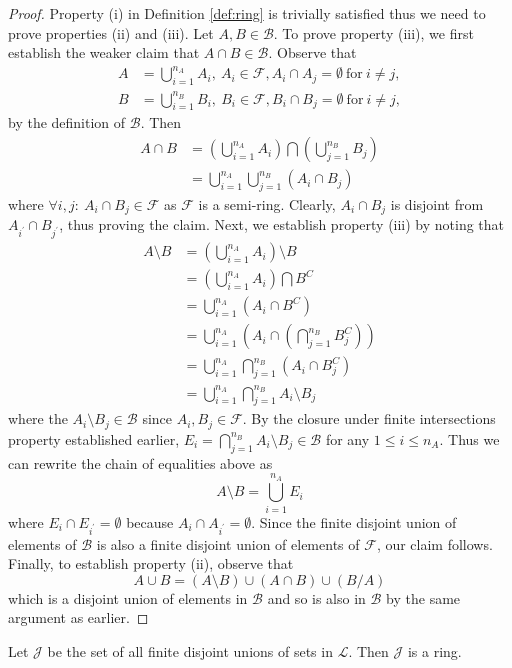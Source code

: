 \begin{proof}
Property (i) in Definition \ref{def:ring} is trivially satisfied
thus we need to prove properties (ii) and (iii). Let $A,B\in\mathcal{B}$.
To prove property (iii), we first establish the weaker claim that
$A\cap B\in\mathcal{B}$. Observe that
\begin{align*}
A & =\bigcup_{i=1}^{n_{A}}A_{i},\ A_{i}\in\mathcal{F},A_{i}\cap A_{j}=\emptyset\mathrm{\ for\ }i\neq j,\\
B & =\bigcup_{i=1}^{n_{B}}B_{i},\ B_{i}\in\mathcal{F},B_{i}\cap B_{j}=\emptyset\mathrm{\ for\ }i\neq j,
\end{align*}
by the definition of $\mathcal{B}.$ Then
\begin{align*}
A\cap B & =\left(\bigcup_{i=1}^{n_{A}}A_{i}\right)\bigcap\left(\bigcup_{j=1}^{n_{B}}B_{j}\right)\\
 & =\bigcup_{i=1}^{n_{A}}\bigcup_{j=1}^{n_{B}}\left(A_{i}\cap B_{j}\right)
\end{align*}
where $\forall i,j:\ A_{i}\cap B_{j}\in\mathcal{F}$ as $\mathcal{F}$
is a semi-ring. Clearly, $A_{i}\cap B_{j}$ is disjoint from $A_{i^{\prime}}\cap B_{j^{\prime}}$,
thus proving the claim. Next, we establish property (iii) by noting
that
\begin{align*}
A\setminus B & =\left(\bigcup_{i=1}^{n_{A}}A_{i}\right)\setminus B\\
 & =\left(\bigcup_{i=1}^{n_{A}}A_{i}\right)\bigcap B^{C}\\
 & =\bigcup_{i=1}^{n_{A}}\left(A_{i}\cap B^{C}\right)\\
 & =\bigcup_{i=1}^{n_{A}}\left(A_{i}\cap\left(\bigcap_{j=1}^{n_{B}}B_{j}^{C}\right)\right)\\
 & =\bigcup_{i=1}^{n_{A}}\bigcap_{j=1}^{n_{B}}\left(A_{i}\cap B_{j}^{C}\right)\\
 & =\bigcup_{i=1}^{n_{A}}\bigcap_{j=1}^{n_{B}}A_{i}\setminus B_{j}
\end{align*}
where the $A_{i}\setminus B_{j}\in\mathcal{B}$ since $A_{i},B_{j}\in\mathcal{F}$.
By the closure under finite intersections property established earlier,
$E_{i}=\bigcap_{j=1}^{n_{B}}A_{i}\setminus B_{j}\in\mathcal{B}$ for
any $1\leq i\leq n_{A}$. Thus we can rewrite the chain of equalities
above as
\[
A\setminus B=\bigcup_{i=1}^{n_{A}}E_{i}
\]
where $E_{i}\cap E_{i^{\prime}}=\emptyset$ because $A_{i}\cap A_{i^{\prime}}=\emptyset.$
Since the finite disjoint union of elements of $\mathcal{B}$ is also
a finite disjoint union of elements of $\mathcal{F}$, our claim follows.
Finally, to establish property (ii), observe that
\[
A\cup B=\left(A\setminus B\right)\cup\left(A\cap B\right)\cup\left(B/A\right)
\]
which is a disjoint union of elements in $\mathcal{B}$ and so is
also in $\mathcal{B}$ by the same argument as earlier.
\end{proof}
\begin{cor}
Let $\mathcal{J}$ be the set of all finite disjoint unions of sets
in $\mathcal{L}$. Then $\mathcal{J}$ is a ring.
\end{cor}

